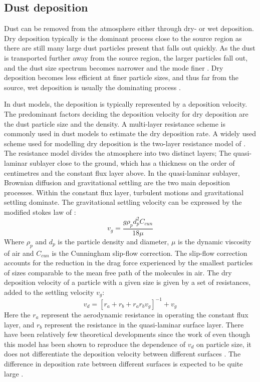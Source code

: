 \subsection{Dust deposition}
Dust can be removed from the atmosphere either through dry- or wet deposition. 
Dry deposition typically is the dominant process close to the source region as there are still many large dust particles present that falls out quickly. 
As the dust is transported further away from the source region, the larger particles fall out, and the dust size spectrum becomes narrower and the mode finer \parencite{does2016particle}.
Dry deposition becomes less efficient at finer particle sizes, and thus far from the source, wet deposition is usually the dominating process \parencite{zhao2003modeled}.


In dust models, the deposition is typically represented by a deposition velocity. 
The predominant factors deciding the deposition velocity for dry deposition are the dust particle size and the density. A multi-layer resistance scheme is commonly used in dust models to estimate the dry deposition rate. A widely used scheme used for modelling dry deposition is the two-layer resistance model of \parencite{slinn1982predictions}. 
The resistance model divides the atmosphere into two distinct layers; The quasi-laminar sublayer close to the ground, which has a thickness on the order of centimetres and the constant flux layer above. In the quasi-laminar sublayer, Brownian diffusion and gravitational settling are the two main deposition processes. Within the constant flux layer, turbulent motions and gravitational settling dominate. The gravitational settling velocity can be expressed by the modified stokes law of \parencite{slinn1982predictions}: 
\begin{equation}
    v_g = \frac{g\rho_p d_p^2 C_{cun}}{18\mu}
\end{equation}
Where $\rho_p$ and $d_p$ is the particle density and diameter, $\mu$ is the dynamic viscosity of air and $C_{cun}$ is the Cunningham slip-flow correction. The slip-flow correction accounts for the reduction in the drag force experienced by the smallest particles of sizes comparable to the mean free path of the molecules in air. The dry deposition velocity of a particle with a given size is given by a set of resistances, added to the settling velocity $v_g$:
\begin{equation}\label{eq:drydep_resistance}
    v_d=[r_a + r_b + r_a r_b v_g]^{-1} + v_g
\end{equation}
Here the $r_a$ represent the aerodynamic resistance in operating the constant flux layer, and $r_b$ represent the resistance in the quasi-laminar surface layer. 
There have been relatively few theoretical developments since the work of \textcite{slinn1982predictions} even though this model has been shown to reproduce the dependence of $v_d$ on particle size, it does not differentiate the deposition velocity between different surfaces \parencite{shao2011dust}.
The difference in deposition rate between different surfaces is expected to be quite large \parencite{bergametti2018size,zeng2019deposition}. 

